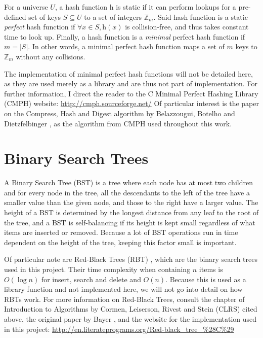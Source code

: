 \documentclass[ %
                    author={Dominic Joseph Moylett},
                    degree={MEng},
                     title={Dictionary Matching with Fingerprints},
                  subtitle={An Empirical Analysis},
                      type={research},
                      year={2015} ]{dissertation}
\begin{document}
For a universe $U$, a hash function $\text{h}$ is static if it can perform lookups for a pre-defined set of keys $S \subseteq U$ to a set of integers $\mathbb{Z}_m$. Said hash function is a static \textit{perfect} hash function if $\forall x \in S, \text{h}(x)$ is collision-free, and thus takes constant time to look up. Finally, a hash function is a \textit{minimal} perfect hash function if $m = |S|$. In other words, a minimal perfect hash function maps a set of $m$ keys to $\mathbb{Z}_m$ without any collisions.

The implementation of minimal perfect hash functions will not be detailed here, as they are used merely as a library and are thus not part of implementation. For further information, I direct the reader to the C Minimal Perfect Hashing Library (CMPH) website: \url{http://cmph.sourceforge.net/} Of particular interest is the paper on the Compress, Hash and Digest algorithm by Belazzougui, Botelho and Dietzfelbinger \cite{belazzougui:chd}, as the algorithm from CMPH used throughout this work.

\section{Binary Search Trees}
A Binary Search Tree (BST) \cite{clrs:bst} is a tree where each node has at most two children and for every node in the tree, all the descendants to the left of the tree have a smaller value than the given node, and those to the right have a larger value. The height of a BST is determined by the longest distance from any leaf to the root of the tree, and a BST is self-balancing if its height is kept small regardless of what items are inserted or removed. Because a lot of BST operations run in time dependent on the height of the tree, keeping this factor small is important.

Of particular note are Red-Black Trees (RBT) \cite{clrs:rbt}, which are the binary search trees used in this project. Their time complexity when containing $n$ items is $O(\log n)$ for insert, search and delete and $O(n)$. Because this is used as a library function and not implemented here, we will not go into detail on how RBTs work. For more information on Red-Black Trees, consult the chapter of Introduction to Algorithms by Cormen, Leiserson, Rivest and Stein (CLRS) cited above, the original paper by Bayer \cite{bayer:rbt}, and the website for the implementation used in this project: \url{http://en.literateprograms.org/Red-black_tree_%28C%29}
\end{document}
